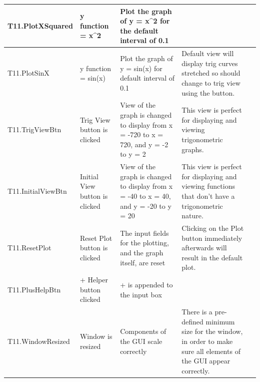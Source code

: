 \documentclass[a4paper, oneside, 11pt]{report}
\begin{document}
\begin{tabular}{|p{1.5in}|p{1.5in}|p{1.6in}|p{1.6in}|p{2.4in}|}
        \hline
        T11.PlotXSquared        & y function = x^2                  & Plot the graph of y = x^2 for the default interval of 0.1                                      &                                         \\
        \hline
        T11.PlotSinX        & y function = sin(x)                  & Plot the graph of y = sin(x) for default interval of 0.1                                  & Default view will display trig curves stretched so should change to trig view using the button. \\
        \hline
        T11.TrigViewBtn        & Trig View button is clicked                   & View of the graph is changed to display from x = -720 to x = 720, and y = -2 to y = 2                                     & This view is perfect for displaying and viewing trigonometric graphs.                                         \\
        \hline
        T11.InitialViewBtn        & Initial View button is clicked                   & View of the graph is changed to display from x = -40 to x = 40, and y = -20 to y = 20                                     & This view is perfect for displaying and viewing functions that don't have a trigonometric nature.                                         \\
        \hline
        T11.ResetPlot        & Reset Plot button is clicked                   & The input fields for the plotting, and the graph itself, are reset                                      & Clicking on the Plot button immediately afterwards will result in the default plot.                                        \\
        \hline
        T11.PlusHelpBtn        & + Helper button clicked                   & + is appended to the input box                                      &                                         \\
        \hline
        T11.WindowResized      & Window is resized        & Components of the GUI scale correctly                                     & There is a pre-defined minimum size for the window, in order to make sure all elements of the GUI appear correctly.                                         \\
        \hline
    \end{tabular}
\end{document}
